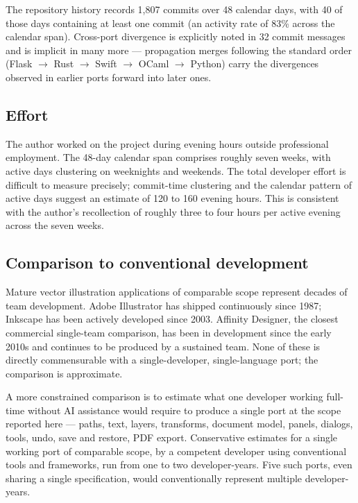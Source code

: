 \documentclass[10pt]{article}
\begin{document}
The repository history records 1{,}807 commits over 48 calendar days,
with 40 of those days containing at least one commit (an activity rate
of 83\% across the calendar span). Cross-port divergence is explicitly
noted in 32 commit messages and is implicit in many more --- propagation
merges following the standard order (Flask $\rightarrow$ Rust
$\rightarrow$ Swift $\rightarrow$ OCaml $\rightarrow$ Python) carry the
divergences observed in earlier ports forward into later ones.

\subsection{Effort}

The author worked on the project during evening hours outside
professional employment. The 48-day calendar span comprises roughly
seven weeks, with active days clustering on weeknights and weekends.
The total developer effort is difficult to measure precisely;
commit-time clustering and the calendar pattern of active days suggest
an estimate of 120 to 160 evening hours. This is consistent with the
author's recollection of roughly three to four hours per active evening
across the seven weeks.

\subsection{Comparison to conventional development}

Mature vector illustration applications of comparable scope represent
decades of team development. Adobe Illustrator has shipped continuously
since 1987; Inkscape has been actively developed since 2003. Affinity
Designer, the closest commercial single-team comparison, has been in
development since the early 2010s and continues to be produced by a
sustained team. None of these is directly commensurable with a
single-developer, single-language port; the comparison is approximate.

A more constrained comparison is to estimate what one developer working
full-time without AI assistance would require to produce a single port
at the scope reported here --- paths, text, layers, transforms, document
model, panels, dialogs, tools, undo, save and restore, PDF export.
Conservative estimates for a single working port of comparable scope, by
a competent developer using conventional tools and frameworks, run from
one to two developer-years. Five such ports, even sharing a single
specification, would conventionally represent multiple developer-years.
\end{document}
